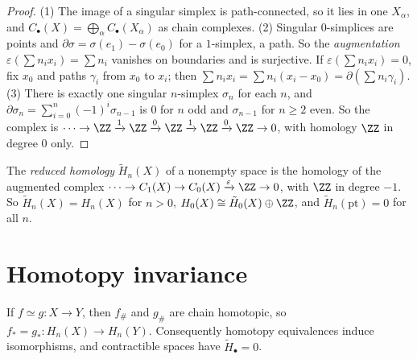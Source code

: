 \begin{proof}
(1) The image of a singular simplex is path-connected, so it lies in one $X_\alpha$, and $C_\bullet(X) = \bigoplus_\alpha C_\bullet(X_\alpha)$ as chain complexes.
(2) Singular $0$-simplices are points and $\partial\sigma = \sigma(e_1) - \sigma(e_0)$ for a $1$-simplex, a path. So the \emph{augmentation}
$\varepsilon(\sum n_ix_i) = \sum n_i$ vanishes on boundaries and is surjective. If $\varepsilon(\sum n_ix_i) = 0$, fix $x_0$ and paths $\gamma_i$ from $x_0$
to $x_i$; then $\sum n_ix_i = \sum n_i(x_i - x_0) = \partial(\sum n_i\gamma_i)$. (3) There is exactly one singular $n$-simplex $\sigma_n$ for each $n$, and
$\partial\sigma_n = \sum_{i=0}^n(-1)^i\sigma_{n-1}$ is $0$ for $n$ odd and $\sigma_{n-1}$ for $n \geq 2$ even. So the complex is
$\cdots \to \ZZ \xrightarrow{1} \ZZ \xrightarrow{0} \ZZ \xrightarrow{1} \ZZ \xrightarrow{0} \ZZ \to 0$, with homology $\ZZ$ in degree $0$ only.
\end{proof}

\begin{definition}\label{singular-homology:definition-reduced}
The \emph{reduced homology} $\tilde{H}_n(X)$ of a nonempty space is the homology of the augmented complex
$\cdots \to C_1(X) \to C_0(X) \xrightarrow{\varepsilon} \ZZ \to 0$, with $\ZZ$ in degree $-1$. So $\tilde{H}_n(X) = H_n(X)$ for $n > 0$,
$H_0(X) \cong \tilde{H}_0(X) \oplus \ZZ$, and $\tilde{H}_n(\mathrm{pt}) = 0$ for all $n$.
\end{definition}

\section{Homotopy invariance}\label{singular-homology:section-homotopy-invariance}

\begin{theorem}\label{singular-homology:theorem-homotopy-invariance}
If $f \simeq g \colon X \to Y$, then $f_\#$ and $g_\#$ are chain homotopic, so $f_* = g_* \colon H_n(X) \to H_n(Y)$. Consequently homotopy equivalences
induce isomorphisms, and contractible spaces have $\tilde{H}_\bullet = 0$.
\end{theorem}

